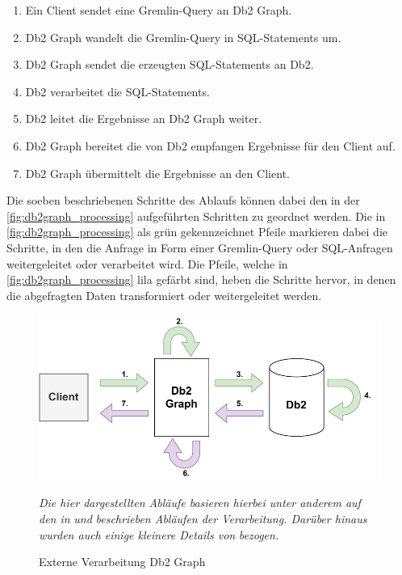 \begin{enumerate}
    \item Ein Client sendet eine Gremlin-Query an Db2 Graph. 
    \item Db2 Graph wandelt die Gremlin-Query in SQL-Statements um. 
    \item Db2 Graph sendet die erzeugten SQL-Statements an Db2.
    \item Db2 verarbeitet die SQL-Statements.
    \item Db2 leitet die Ergebnisse an Db2 Graph weiter.
    \item Db2 Graph bereitet die von Db2 empfangen Ergebnisse für den Client auf. 
    \item Db2 Graph übermittelt die Ergebnisse an den Client.
\end{enumerate}

Die soeben beschriebenen Schritte des Ablaufs können dabei den in der \autoref{fig:db2graph_processing} aufgeführten Schritten zu geordnet werden. Die in \autoref{fig:db2graph_processing} als grün gekennzeichnet Pfeile markieren dabei die Schritte, in den die Anfrage in Form einer Gremlin-Query oder SQL-Anfragen weitergeleitet oder verarbeitet wird. Die Pfeile, welche in \autoref{fig:db2graph_processing} lila gefärbt sind, heben die Schritte hervor, in denen die abgefragten Daten transformiert oder weitergeleitet werden.

\begin{figure}[ht]
    \centering
    \includegraphics[width=\textwidth]{images/db2graph_processing.pdf}
    \caption{Externe Verarbeitung Db2 Graph}
    \label{fig:db2graph_processing}
    \vspace{1em}
    \textit{Die hier dargestellten Abläufe basieren hierbei unter anderem auf den in} \cite{vldb_tian} \textit{und} \cite{sigmod_tian} \textit{beschrieben Abläufen der Verarbeitung. Darüber hinaus wurden auch einige kleinere Details von} \cite{tinkerpop_2020} \textit{bezogen.} 
\end{figure}

